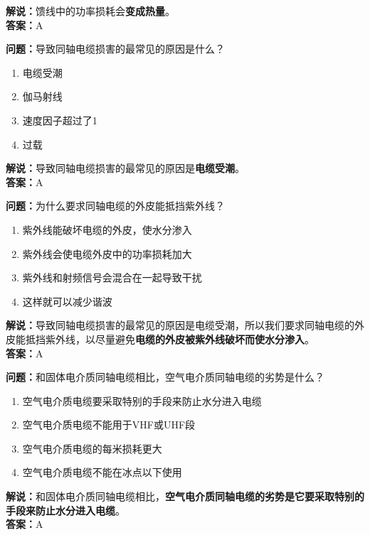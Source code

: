 \textbf{解说：}馈线中的功率损耗会\textbf{变成热量}。\\\textbf{答案：}A



\textbf{问题：}导致同轴电缆损害的最常见的原因是什么？

\begin{enumerate}[label=\Alph*), leftmargin=1cm]
	\item 电缆受潮
	\item 伽马射线
	\item 速度因子超过了1
	\item 过载
\end{enumerate}

\textbf{解说：}导致同轴电缆损害的最常见的原因是\textbf{电缆受潮}。\\\textbf{答案：}A



\textbf{问题：}为什么要求同轴电缆的外皮能抵挡紫外线？

\begin{enumerate}[label=\Alph*), leftmargin=1cm]
	\item 紫外线能破坏电缆的外皮，使水分渗入
	\item 紫外线会使电缆外皮中的功率损耗加大
	\item 紫外线和射频信号会混合在一起导致干扰
	\item 这样就可以减少谐波
\end{enumerate}

\textbf{解说：}导致同轴电缆损害的最常见的原因是电缆受潮，所以我们要求同轴电缆的外皮能抵挡紫外线，以尽量避免\textbf{电缆的外皮被紫外线破坏而使水分渗入}。\\\textbf{答案：}A%



\textbf{问题：}和固体电介质同轴电缆相比，空气电介质同轴电缆的劣势是什么？

\begin{enumerate}[label=\Alph*), leftmargin=1cm]
	\item 空气电介质电缆要采取特别的手段来防止水分进入电缆
	\item 空气电介质电缆不能用于VHF或UHF段
	\item 空气电介质电缆的每米损耗更大
	\item 空气电介质电缆不能在冰点以下使用
\end{enumerate}

\textbf{解说：}和固体电介质同轴电缆相比，\textbf{空气电介质同轴电缆的劣势是它要采取特别的手段来防止水分进入电缆}。\\\textbf{答案：}A%



